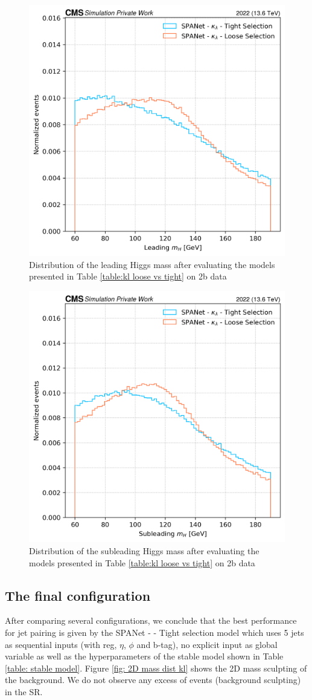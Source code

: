 \begin{figure}[hbt]
    \centering
    \includegraphics[width=0.6\linewidth]{Images/6.Improving/kappa lambda/leading h mass sculp.png}
    \caption{Distribution of the leading Higgs mass after evaluating the models presented in Table \ref{table:kl loose vs tight} on 2b data}
    \label{fig: leading H mass dist}
\end{figure}

\begin{figure}[hbt]
    \centering
    \includegraphics[width=0.6\linewidth]{Images/6.Improving/kappa lambda/sub leading H mass sculpt.png}
    \caption{Distribution of the subleading Higgs mass after evaluating the models presented in Table \ref{table:kl loose vs tight} on 2b data}
    \label{fig: subleading H mass dist}
\end{figure}

\newpage

\subsection{The final configuration} \label{subsection: Optimal config}
After comparing several configurations, we conclude that the best performance for jet pairing is given by the SPANet - \kl - Tight selection model which uses 5 jets as sequential inputs (with \pt reg, $\eta$, $\phi$ and b-tag), no explicit \kl input as global variable as well as the hyperparameters of the stable model shown in Table \ref{table: stable model}.
Figure \ref{fig: 2D mass dist kl} shows the 2D mass sculpting of the background. We do not observe any excess of events (background sculpting) in the SR.

